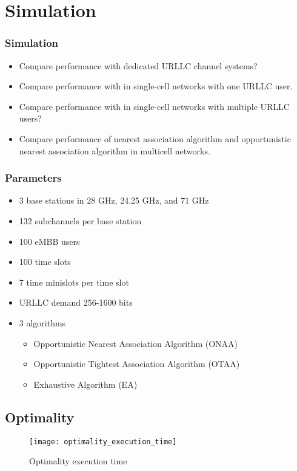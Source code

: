 \section{Simulation}
\begin{frame}
  \frametitle{Simulation}
  \begin{itemize}
    \item Compare performance with dedicated URLLC channel systems?
    \item Compare performance with \cite{AVS20} in single-cell networks with one URLLC user.
    \item Compare performance with \cite{YZR21} in single-cell networks with multiple URLLC users?
    \item Compare performance of nearest association algorithm and opportunistic nearest association algorithm in multicell networks.
  \end{itemize}
\end{frame}

\begin{frame}
  \frametitle{Parameters}
  \begin{itemize}
    \item 3 base stations in 28 GHz, 24.25 GHz, and 71 GHz \cite{3GPP22, SRRTGKRKPJ16}
    \item 132 subchannels per base station \cite{3GPP22}
    \item 100 eMBB users
    \item 100 time slots
    \item 7 time minislots per time slot
    \item URLLC demand 256-1600 bits \cite{3GPP17}
    \item 3 algorithms
      \begin{itemize}
        \item Opportunistic Nearest Association Algorithm (ONAA)
        \item Opportunistic Tightest Association Algorithm (OTAA)
        \item Exhaustive Algorithm (EA)
      \end{itemize}
  \end{itemize}
\end{frame}

\subsection{Optimality}
\begin{frame}
  \begin{figure}
    \texttt{[image: optimality\_execution\_time]}
    \caption{Optimality execution time}
  \end{figure}
\end{frame}


